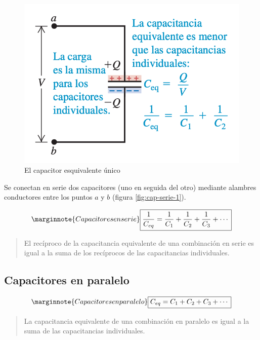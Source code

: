 \begin{figure}[h]
\centering
\includegraphics[scale=0.4]{fig/cap-serie-2}
\caption{El capacitor esquivalente único}
\label{fig:cap-serie-2}
\end{figure}

Se conectan en serie dos capacitores (uno en seguida del otro) mediante alambres conductores entre los puntos $a$ y $b$ (figura \ref{fig:cap-serie-1}).

\begin{equation}\label{24.5}\marginnote{Capacitores en serie}
\boxed{\frac{1}{C_{eq}}=\frac{1}{C_1}+\frac{1}{C_2}+\frac{1}{C_3}+\cdots}
\end{equation}

\begin{quote}
El recíproco de la capacitancia equivalente de una combinación en serie es igual a la suma de los recíprocos de las capacitancias individuales.
\end{quote}

\subsection{Capacitores en paralelo}
\begin{equation}\label{Capacitores en paralelo}\marginnote{Capacitores en paralelo}
\boxed{C_{eq}=C_1+C_2+C_3+\cdots}
\end{equation}

\begin{quote}
La capacitancia equivalente de una combinación en paralelo es igual a la suma de las capacitancias individuales.
\end{quote}

